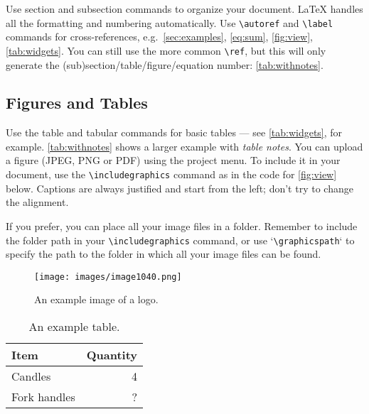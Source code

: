 \documentclass[11pt]{report}
\begin{document}
Use section and subsection commands to organize your document. \LaTeX{} handles all the formatting and numbering automatically. Use \verb|\autoref| and \verb|\label| commands for cross-references, e.g.~\autoref{sec:examples}, \autoref{eq:sum}, \autoref{fig:view}, \autoref{tab:widgets}. You can still use the more common \verb|\ref|, but this will only generate the (sub)section/table/figure/equation number: \ref{tab:withnotes}. 

\subsection{Figures and Tables}

Use the table and tabular commands for basic tables --- see \autoref{tab:widgets}, for example. \autoref{tab:withnotes} shows a larger example with \emph{table notes}. You can upload a figure (JPEG, PNG or PDF) using the project menu. To include it in your document, use the \verb|\includegraphics| command as in the code for \autoref{fig:view} below. Captions are always justified and start from the left; don't try to change the alignment.

If you prefer, you can place all your image files in a folder. Remember to include the folder path in your \verb|\includegraphics| command, or use `\verb|\graphicspath|` to specify the path to the folder in which all your image files can be found.

\begin{figure}[ht]\centering
\texttt{[image: images/image1040.png]}
\caption{An example image of a logo.}
\label{fig:view}
\end{figure}

\begin{table}[ht]\centering
\caption{An example table.}\label{tab:widgets}
\begin{tabular}{l r}
\toprule
Item & Quantity \\\midrule
Candles & 4 \\
Fork handles & ?\\
\bottomrule
\end{tabular}
\end{table}
\end{document}
